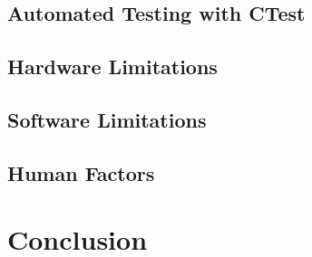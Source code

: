\documentclass[MSc,paper=a4,pagesize=auto]{icldt}
\begin{document}
\section{Automated Testing with CTest}
\section{Hardware Limitations}
\section{Software Limitations}
\section{Human Factors}


\chapter{Conclusion}
\nocite{Margulies2013}

	
\end{document}
